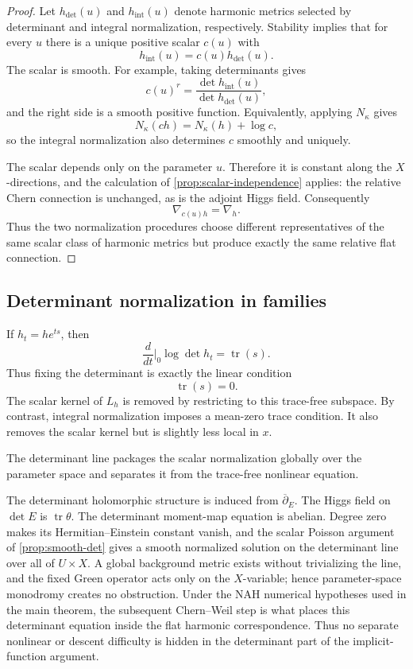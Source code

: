 \documentclass[11pt,reqno]{amsart}
\theoremstyle{definition}
\theoremstyle{remark}
\newcommand{\tr}{\operatorname{tr}}
\newcommand{\ddbar}{\overline\partial}
\begin{document}
\begin{proof}
Let $h_{\det}(u)$ and $h_{\mathrm{int}}(u)$ denote harmonic metrics selected by determinant and integral normalization, respectively.  Stability implies that for every $u$ there is a unique positive scalar $c(u)$ with
\[
  h_{\mathrm{int}}(u)=c(u)h_{\det}(u).
\]
The scalar is smooth.  For example, taking determinants gives
\[
  c(u)^r=\frac{\det h_{\mathrm{int}}(u)}{\det h_{\det}(u)},
\]
and the right side is a smooth positive function.  Equivalently, applying $N_\kappa$ gives
\[
  N_\kappa(c h)=N_\kappa(h)+\log c,
\]
so the integral normalization also determines $c$ smoothly and uniquely.

The scalar depends only on the parameter $u$.  Therefore it is constant along the $X$-directions, and the calculation of \cref{prop:scalar-independence} applies: the relative Chern connection is unchanged, as is the adjoint Higgs field.  Consequently
\[
  \nabla_{c(u)h}=\nabla_h.
\]
Thus the two normalization procedures choose different representatives of the same scalar class of harmonic metrics but produce exactly the same relative flat connection.
\end{proof}

\subsection{Determinant normalization in families}

If $h_t=he^{ts}$, then
\[
  \frac d{dt}\bigg|_0\log\det h_t=\tr(s).
\]
Thus fixing the determinant is exactly the linear condition
\[
  \tr(s)=0.
\]
The scalar kernel of $L_h$ is removed by restricting to this trace-free subspace.  By contrast, integral normalization imposes a mean-zero trace condition.  It also removes the scalar kernel but is slightly less local in $x$.


The determinant line packages the scalar normalization globally over the parameter space and separates it from the trace-free nonlinear equation.


The determinant holomorphic structure is induced from $\ddbar_E$.  The Higgs field on $\det E$ is $\tr\theta$.  The determinant moment-map equation is abelian.  Degree zero makes its Hermitian--Einstein constant vanish, and the scalar Poisson argument of \cref{prop:smooth-det} gives a smooth normalized solution on the determinant line over all of $U\times X$.  A global background metric exists without trivializing the line, and the fixed Green operator acts only on the $X$-variable; hence parameter-space monodromy creates no obstruction.  Under the NAH numerical hypotheses used in the main theorem, the subsequent Chern--Weil step is what places this determinant equation inside the flat harmonic correspondence.  Thus no separate nonlinear or descent difficulty is hidden in the determinant part of the implicit-function argument.
\end{document}
